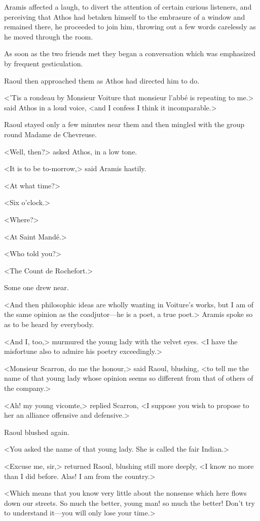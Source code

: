 Aramis affected a laugh, to divert the attention of certain curious listeners, and perceiving that Athos had betaken himself to the embrasure of a window and remained there, he proceeded to join him, throwing out a few words carelessly as he moved through the room.

As soon as the two friends met they began a conversation which was emphasized by frequent gesticulation.

Raoul then approached them as Athos had directed him to do.

<'Tis a rondeau by Monsieur Voiture that monsieur l'abbé is repeating to me.> said Athos in a loud voice, <and I confess I think it incomparable.>

Raoul stayed only a few minutes near them and then mingled with the group round Madame de Chevreuse.

<Well, then?> asked Athos, in a low tone.

<It is to be to-morrow,> said Aramis hastily.

<At what time?>

<Six o'clock.>

<Where?>

<At Saint Mandé.>

<Who told you?>

<The Count de Rochefort.>

Some one drew near.

<And then philosophic ideas are wholly wanting in Voiture's works, but I am of the same opinion as the coadjutor—he is a poet, a true poet.> Aramis spoke so as to be heard by everybody.

<And I, too,> murmured the young lady with the velvet eyes. <I have the misfortune also to admire his poetry exceedingly.>

<Monsieur Scarron, do me the honour,> said Raoul, blushing, <to tell me the name of that young lady whose opinion seems so different from that of others of the company.>

<Ah! my young vicomte,> replied Scarron, <I suppose you wish to propose to her an alliance offensive and defensive.>

Raoul blushed again.

<You asked the name of that young lady. She is called the fair Indian.>

<Excuse me, sir,> returned Raoul, blushing still more deeply, <I know no more than I did before. Alas! I am from the country.>

<Which means that you know very little about the nonsense which here flows down our streets. So much the better, young man! so much the better! Don't try to understand it—you will only lose your time.>

